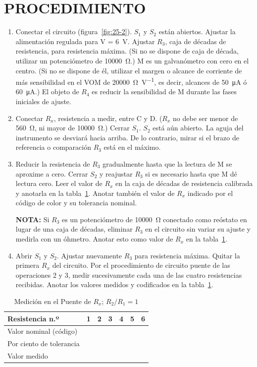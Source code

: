 \documentclass{article}
\numberwithin{equation}{subsection}
\numberwithin{figure}{section}
\numberwithin{table}{section}
\begin{document}
\section{PROCEDIMIENTO}
\begin{enumerate}
    \item Conectar el circuito (figura~\ref{fig:25-2}). $S_1$ y $S_2$ están abiertos. Ajustar la alimentación regulada para 
    V = \SI{6}{\volt}. Ajustar $R_3$, caja de décadas de resistencia, para resistencia máxima. (Si no se dispone de 
    caja de década, utilizar un potenciómetro de \SI{10000}{\ohm}.) M es un galvanómetro con cero en el centro. 
    (Si no se dispone de él, utilizar el margen o alcance de corriente de más sensibilidad en el VOM de \SI{20000}{\ohm\per\volt}, 
    es decir, alcances de \SI{50}{\micro\ampere} ó \SI{60}{\micro\ampere}.) El objeto de $R_4$ es reducir la sensibilidad 
    de M durante las fases iniciales de ajuste.
    \item Conectar $R_x$, resistencia a medir, entre C y D. ($R_x$ no debe ser menor de \SI{560}{\ohm}, ni mayor de \SI{10000}{\ohm}.) 
    Cerrar $S_1$. $S_2$ está aún abierto. La aguja del instrumento se desviará hacia arriba. De lo contrario, mirar si 
    el brazo de referencia o comparación $R_3$ está en el máximo.
    \item Reducir la resistencia de $R_3$ gradualmente hasta que la lectura de M se aproxime a cero. Cerrar $S_2$ y 
    reajustar $R_3$ si es necesario hasta que M dé lectura cero. Leer el valor de $R_x$ en la caja de décadas de 
    resistencia calibrada y anotarla en la tabla~\ref{tab:25-1}. Anotar también el valor de $R_x$ indicado por el código de color 
    y su tolerancia nominal.
    
    \textbf{NOTA:} Si $R_3$ es un potenciómetro de \SI{10000}{\ohm} conectado como reóstato en lugar de una caja de 
    décadas, eliminar $R_3$ en el circuito sin variar su ajuste y medirla con un óhmetro. Anotar esto como valor 
    de $R_x$ en la tabla~\ref{tab:25-1}.
    
    \item Abrir $S_1$ y $S_2$. Ajustar nuevamente $R_3$ para resistencia máxima. Quitar la primera $R_x$ del circuito. 
    Por el procedimiento de circuito puente de las operaciones 2 y 3, medir sucesivamente cada una de las cuatro 
    resistencias recibidas. Anotar los valores medidos y codificados en la tabla~\ref{tab:25-1}.
\end{enumerate}

\begin{table}[!htbp]
    \centering
    \caption{Medición en el Puente de $R_x$; $R_2/R_1 = 1$}
    \label{tab:25-1}
    \begin{tabular}{lcccccc}
        \toprule
        \textbf{Resistencia n.º} & \textbf{1} & \textbf{2} & \textbf{3} & \textbf{4} & \textbf{5} & \textbf{6} \\ \midrule
        Valor nominal (código) & & & & & & \\ \midrule
        Por ciento de tolerancia & & & & & & \\ \midrule
        Valor medido & & & & & & \\ \bottomrule
    \end{tabular}
\end{table}
\end{document}
